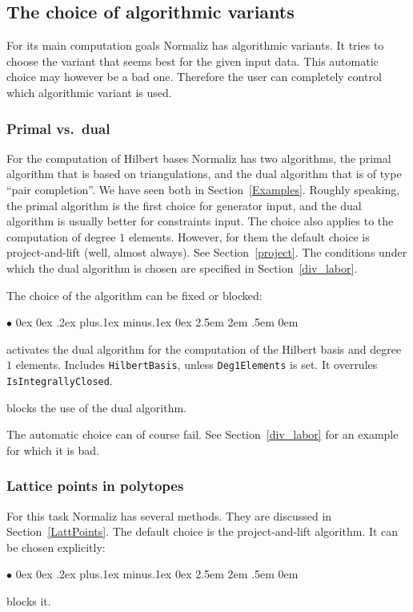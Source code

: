 \documentclass[12pt,a4paper]{scrartcl}
\newcommand{\stdli}{ \topsep0ex \partopsep0ex %
\parsep.2ex plus.1ex minus.1ex \itemsep0ex%
\leftmargin2.5em \labelwidth2em \labelsep.5em \rightmargin0em}%
\renewenvironment{itemize}{\begin{list}{{$\bullet$}}{\stdli}}{\end{list}}
\theoremstyle{definition}
\def\itemtt[#1]{\item[\textbf{\ttt{#1}}]}
\def\ttt{\texttt}
\begin{document}
\subsection{The choice of algorithmic variants}

For its main computation goals Normaliz has algorithmic variants. It tries to choose the variant that seems best for the given input data. This automatic choice may however be a bad one. Therefore the user can completely control which algorithmic variant is used.

\subsubsection{Primal vs.\ dual}

For the computation of Hilbert bases Normaliz has two algorithms, the primal algorithm that is based on triangulations, and the dual algorithm that is of type ``pair completion''. We have seen both in Section~\ref{Examples}. Roughly speaking, the primal algorithm is the first choice for generator input, and the dual algorithm is usually better for constraints input. The choice also applies to the computation of degree $1$ elements. However, for them the default choice is project-and-lift (well, almost always). See Section~\ref{project}. The conditions under which the dual algorithm is chosen are specified in Section~\ref{div_labor}.

The choice of the algorithm can be fixed or blocked:
\begin{itemize}
	\itemtt[DualMode, -d] activates the dual algorithm for the computation of the Hilbert basis and degree $1$ elements. Includes \verb|HilbertBasis|, unless \verb|Deg1Elements| is set. It overrules \verb|IsIntegrallyClosed|.
	
	\itemtt[PrimalMode, -P] blocks the use of the dual algorithm.
\end{itemize}

The automatic choice can of course fail. See Section~\ref{div_labor} for an example for which it is bad.

\subsubsection{Lattice points in polytopes}\label{approximate}

For this task Normaliz has several methods. They are discussed in Section~\ref{LattPoints}. The default choice is the project-and-lift algorithm. It can be chosen explicitly:
\begin{itemize}
	\itemtt[Projection, -j]
	
	\itemtt[NoProjection] blocks it.
\end{itemize}
\end{document}
